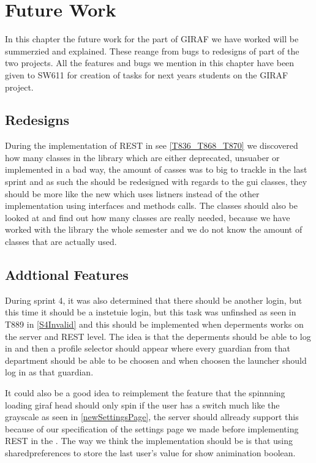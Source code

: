 \chapter{Future Work}
In this chapter the future work for the part of GIRAF we have worked will be
summerzied and explained. These reange from bugs to redesigns of part of the two
projects. All the features and bugs we mention in this chapter have been given
to SW611 for creation of tasks for next years students on the GIRAF project.

\section{Redesigns}
During the implementation of REST in  see
\autoref{T836_T868_T870} we discovered how many classes in the library which are
either deprecated, unsuaber or implemented in a bad way, the amount of casses
was to big to trackle in the last sprint and as such the 
should be redesigned with regards to the gui classes, they should be more like
the new  which uses listners instead of the other
implementation using interfaces and methods calls. The classes should also be
looked at and find out how many classes are really needed, because we have
worked with the library the whole semester and we do not know the amount of
classes that are actually used.

\section{Addtional Features}
During sprint 4, it was also determined that there should be another login, but
this time it should be a instetuie login, but this task was unfinshed as seen in
T889 in \autoref{S4Invalid} and this should be implemented when deperments works
on the server and REST level. The idea is that the deperments should be able to log in
and then a profile selector should appear where every guardian from that
department should be able to be choosen and when choosen the launcher should log
in as that guardian.\nl

It could also be a good idea to reimplement the feature that the spinnning
loading giraf head should only spin if the user has a switch much like the
grayscale as seen in \autoref{newSettingsPage}, the server should allready
support this because of our specification of the settings page we made before
implementing REST in the . The way we think the implementation
should be is that using sharedpreferences to store the last user's value for show
animination boolean.

